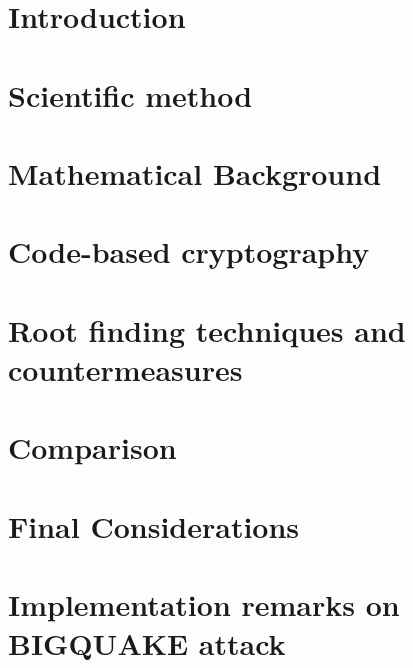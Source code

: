 \documentclass[brazil, english]{ufsc-thesis}
\begin{document}


\textual

\chapter{Introduction}
\label{ch:intro}


\chapter{Scientific method}
\label{ch:method}


\chapter{Mathematical Background}
\label{ch:math}


\chapter{Code-based cryptography}
\label{ch:code-based}


\chapter{Root finding techniques and countermeasures}
\label{ch:roots}


\chapter{Comparison}
\label{ch:comparison}


\chapter{Final Considerations}
\label{ch:final}



\postextual


\appendix
\chapter{Implementation remarks on BIGQUAKE attack}\label{ch:imp-remarks}

\end{document}
